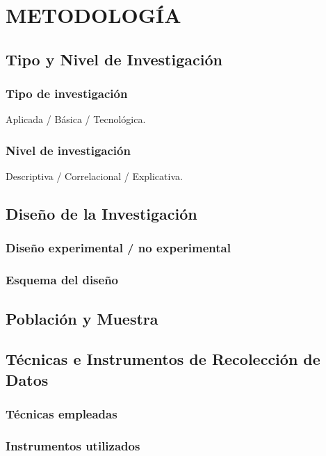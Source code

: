 \documentclass[12pt, letterpaper, oneside]{book}
\begin{document}
\chapter{METODOLOGÍA}

\section{Tipo y Nivel de Investigación}
\subsection{Tipo de investigación}
Aplicada / Básica / Tecnológica.

\subsection{Nivel de investigación}
Descriptiva / Correlacional / Explicativa.

\section{Diseño de la Investigación}
\subsection{Diseño experimental / no experimental}
\subsection{Esquema del diseño}

\section{Población y Muestra}

\section{Técnicas e Instrumentos de Recolección de Datos}
\subsection{Técnicas empleadas}
\subsection{Instrumentos utilizados}
\end{document}
